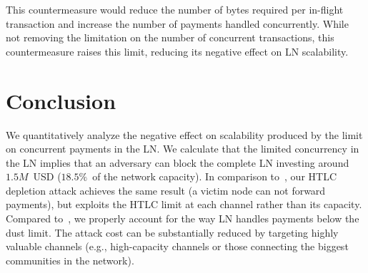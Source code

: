 This countermeasure would reduce the number of bytes required per in-flight transaction and increase the number of payments handled concurrently.
While not removing the limitation on the number of concurrent transactions, this countermeasure raises this limit, reducing its negative effect on LN scalability.


\section{Conclusion}

We quantitatively analyze the negative effect on scalability produced by the limit on concurrent payments in the LN\@.
We calculate that the limited concurrency in the LN implies that an adversary can block the complete LN investing around $1.5M$~USD ($18.5\%$~of the network capacity).
In comparison to~\cite{PerezSola2019}, our HTLC depletion attack achieves the same result (a victim node can not forward payments), but exploits the HTLC limit at each channel rather than its capacity.
Compared to~\cite{Mizrahi2020}, we properly account for the way LN handles payments below the dust limit.
The attack cost can be substantially reduced by targeting highly valuable channels (e.g., high-capacity channels or those connecting the biggest communities in the network).